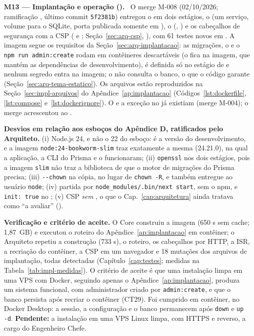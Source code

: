 \textbf{M13 --- Implantação e operação ().} \ O merge M-008 (02/10/2026; ramificação , último commit \texttt{5f2381b}) entregou o  em dois estágios, o  (um serviço, volume  para o SQLite, porta publicada somente em ), o  (, ) e os cabeçalhos de segurança com a CSP ( e ; Seção~\ref{sec:arq-csp}, ), com 61 testes novos em . A imagem segue os requisitos da Seção~\ref{sec:arq-implantacao}: as migrações, o  e o \texttt{npm run admin:create} rodam em contêineres descartáveis (o  fica na imagem, que mantém as dependências de desenvolvimento),  é definida só no estágio de  e nenhum segredo entra na imagem; o  não consulta o banco, o que o código garante (Seção~\ref{sec:arq-tema-estatico}). Os arquivos estão reproduzidos na Seção~\ref{sec:impl-arquivos} do Apêndice~\ref{ap:implantacao} (Códigos~\ref{lst:dockerfile}, \ref{lst:compose} e~\ref{lst:dockerignore}). O  e a exceção no  já existiam (merge M-004); o merge acrescentou  ao .

\textbf{Desvios em relação aos esboços do Apêndice D, ratificados pelo Arquiteto.} (i) Node.js 24, e não o 22 do esboço: é a versão do desenvolvimento, e a imagem \texttt{node:24-bookworm-slim} traz exatamente a mesma (24.21.0), na qual a aplicação, a CLI do Prisma e o  funcionaram; (ii) \texttt{openssl} nos dois estágios, pois a imagem \texttt{slim} não traz a biblioteca de que o motor de migrações do Prisma precisa; (iii) \texttt{-{}-chown} na cópia, no lugar de \texttt{chown -R}, e  também entregue ao usuário \texttt{node}; (iv) partida por \texttt{node\_modules/.bin/next start}, sem o npm, e \texttt{init: true} no ; (v) CSP \emph{sem} , o que o Cap.~\ref{cap:arquitetura} ainda tratava como ``a avaliar'' ().

\textbf{Verificação e critério de aceite.} O Core construiu a imagem (650 s sem cache; 1,87~GB) e executou o roteiro do Apêndice~\ref{ap:implantacao} em contêiner; o Arquiteto repetiu a construção (733 s), o roteiro, os cabeçalhos por HTTP, a ISR, a recriação do contêiner, a CSP em um navegador e 18 mutações dos arquivos de implantação, todas detectadas (Capítulo~\ref{cap:testes}; medidas na Tabela~\ref{tab:impl-medidas}). O critério de aceite é que uma instalação limpa em uma VPS com Docker, seguindo apenas o Apêndice~\ref{ap:implantacao}, produza um sistema funcional, com administrador criado por \texttt{admin:create}, e que o banco persista após recriar o contêiner (CT29). Foi cumprido em contêiner, no Docker Desktop: a sessão, a configuração e o banco permanecem após \texttt{down} e \texttt{up -d}. \textbf{Pendente:} a instalação em uma VPS Linux limpa, com HTTPS e  reverso, a cargo do Engenheiro Chefe.

